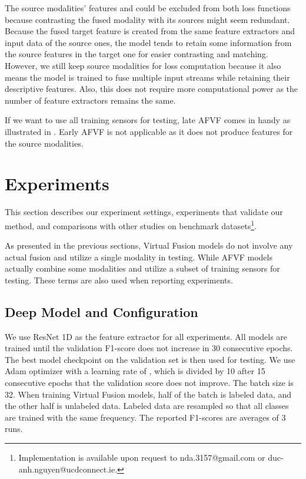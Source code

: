 \documentclass[conference]{IEEEtran}
\begin{document}
The source modalities' features  and  could be excluded from both loss functions because contrasting the fused modality with its sources might seem redundant. Because the fused target feature  is created from the same feature extractors and input data of the source ones, the model tends to retain some information from the source features in the target one for easier contrasting and matching. However, we still keep source modalities for loss computation because it also means the model is trained to fuse multiple input streams while retaining their descriptive features. Also, this does not require more computational power as the number of feature extractors remains the same.

If we want to use all training sensors for testing, late AFVF comes in handy as illustrated in . Early AFVF is not applicable 
as it does not produce features for the source modalities.

\section{Experiments}
This section describes our experiment settings, experiments that validate our method, and comparisons with other studies on benchmark datasets\footnote{Implementation is available upon request to nda.3157@gmail.com or duc-anh.nguyen@ucdconnect.ie.}.

As presented in the previous sections, Virtual Fusion models do not involve any actual fusion and utilize a single modality in testing. While AFVF models actually combine some modalities and utilize a subset of training sensors for testing. These terms are also used when reporting experiments.

\subsection{Deep Model and Configuration}
We use ResNet 1D \cite{resnet1d_github} as the feature extractor for all experiments. All models are trained until the validation F1-score does not increase in 30 consecutive epochs. The best model checkpoint on the validation set is then used for testing. We use Adam optimizer with a learning rate of , which is divided by 10 after 15 consecutive epochs that the validation score does not improve. The batch size is 32. When training Virtual Fusion models, half of the batch is labeled data, and the other half is unlabeled data. Labeled data are resampled so that all classes are trained with the same frequency. The reported F1-scores are averages of 3 runs.
\end{document}
